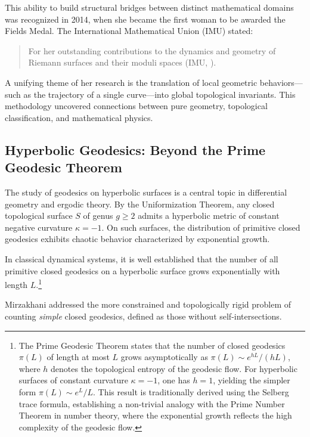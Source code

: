 This ability to build structural bridges between distinct mathematical domains was recognized in 2014, when she became the first woman to be awarded the Fields Medal. The International Mathematical Union (IMU) stated:
\begin{quote}
For her outstanding contributions to the dynamics and geometry of Riemann surfaces and their moduli spaces (IMU, \citeyear{IMU2014}).
\end{quote}

A unifying theme of her research is the translation of local geometric behaviors—such as the trajectory of a single curve—into global topological invariants. This methodology uncovered connections between pure geometry, topological classification, and mathematical physics.


\subsection{Hyperbolic Geodesics: Beyond the Prime Geodesic Theorem}

The study of geodesics on hyperbolic surfaces is a central topic in differential geometry and ergodic theory. By the Uniformization Theorem, any closed topological surface $S$ of genus $g \geq 2$ admits a hyperbolic metric of constant negative curvature $\kappa = -1$. On such surfaces, the distribution of primitive closed geodesics exhibits chaotic behavior characterized by exponential growth.

In classical dynamical systems, it is well established that the number of all primitive closed geodesics on a hyperbolic surface grows exponentially with length $L$.\footnote{The Prime Geodesic Theorem states that the number of closed geodesics $\pi(L)$ of length at most $L$ grows asymptotically as $\pi(L) \sim e^{hL}/(hL)$, where $h$ denotes the topological entropy of the geodesic flow. For hyperbolic surfaces of constant curvature $\kappa = -1$, one has $h = 1$, yielding the simpler form $\pi(L) \sim e^{L}/L$. This result is traditionally derived using the Selberg trace formula, establishing a non-trivial analogy with the Prime Number Theorem in number theory, where the exponential growth reflects the high complexity of the geodesic flow.}

Mirzakhani addressed the more constrained and topologically rigid problem of counting \textit{simple} closed geodesics, defined as those without self-intersections.

